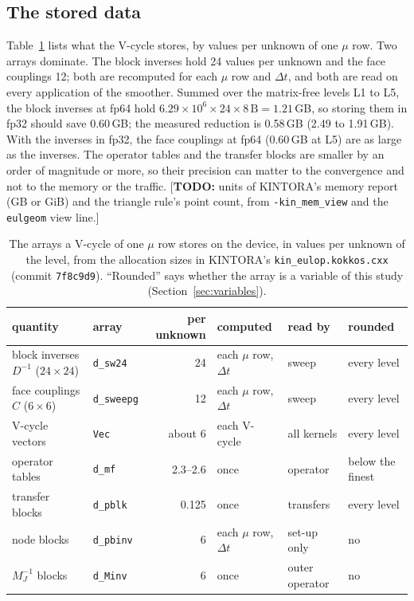 \documentclass[11pt]{article}
\newcommand{\todo}[1]{\textcolor{red!70!black}{\small[\textbf{TODO:} #1]}}
\newcommand{\code}[1]{\texttt{#1}}
\begin{document}
\subsection{The stored data}
\label{sec:data}
Table~\ref{tab:data} lists what the V-cycle stores, by values per unknown of one $\mu$ row.  Two
arrays dominate.  The block inverses hold 24 values per unknown and the face couplings 12;
both are recomputed for each $\mu$ row and $\Delta t$, and both are read on every application of
the smoother.  Summed over the matrix-free levels L1 to L5, the block inverses at fp64 hold
$6.29 \times 10^6 \times 24 \times 8\,\mathrm{B} = 1.21$\,GB, so storing them in fp32 should save
0.60\,GB; the measured reduction is 0.58\,GB (2.49 to 1.91\,GB).  With the inverses in fp32,
the face couplings at fp64 (0.60\,GB at L5) are as large as the inverses.  The operator tables
and the transfer blocks are smaller by an order of magnitude or more, so their precision can
matter to the convergence and not to the memory or the traffic.
\todo{units of KINTORA's memory report (GB or GiB) and the triangle rule's point count, from
\code{-kin\_mem\_view} and the \code{eulgeom} view line.}

\begin{table}[tbp]
  \centering
  \footnotesize
  \caption{The arrays a V-cycle of one $\mu$ row stores on the device, in values per unknown of
    the level, from the allocation sizes in KINTORA's \code{kin\_eulop.kokkos.cxx} (commit
    \code{7f8c9d9}).  ``Rounded'' says whether the array is a variable of this study
    (Section~\ref{sec:variables}).}
  \label{tab:data}
  \begin{tabular}{@{}llrlll@{}}
    \toprule
    quantity & array & per unknown & computed & read by & rounded \\
    \midrule
    block inverses $D^{-1}$ ($24 \times 24$) & \code{d\_sw24} & 24 & each $\mu$ row, $\Delta t$ & sweep & every level \\
    face couplings $C$ ($6 \times 6$) & \code{d\_sweepg} & 12 & each $\mu$ row, $\Delta t$ & sweep & every level \\
    V-cycle vectors & \code{Vec} & about 6 & each V-cycle & all kernels & every level \\
    operator tables & \code{d\_mf} & 2.3--2.6 & once & operator & below the finest \\
    transfer blocks & \code{d\_pblk} & 0.125 & once & transfers & every level \\
    node blocks & \code{d\_pbinv} & 6 & each $\mu$ row, $\Delta t$ & set-up only & no \\
    $M_J^{-1}$ blocks & \code{d\_Minv} & 6 & once & outer operator & no \\
    \bottomrule
  \end{tabular}
\end{table}
\end{document}
